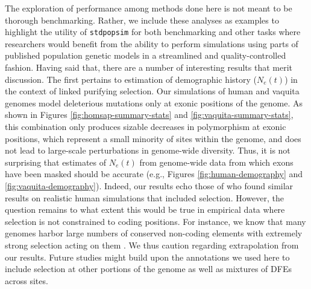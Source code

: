 \documentclass[hidelinks]{article}
\newcommand{\stdpopsim}{\texttt{stdpopsim}\xspace}
\begin{document}
    The exploration of performance among methods done here is not meant to be thorough
    benchmarking.
    Rather, we include these analyses as examples to highlight the utility of \stdpopsim {}
    for both benchmarking and other tasks where researchers would benefit from the ability to perform
    simulations using parts of published population genetic models in a streamlined and quality-controlled fashion.
    Having said that, there are a number of interesting results that merit discussion.
    The first pertains to estimation of demographic history ($N_e(t)$) in the context of
    linked purifying selection. Our simulations of human and vaquita genomes
    model deleterious mutations only at exonic positions of the genome.
    As shown in Figures \ref{fig:homsap-summary-stats} and \ref{fig:vaquita-summary-stats},
    this combination only produces sizable decreases in polymorphism at exonic positions,
    which represent a small minority of sites within the genome, and does not lead to large-scale
    perturbations in genome-wide diversity. Thus, it is not surprising that estimates of $N_e(t)$
    from genome-wide data from which exons have been masked should be accurate
    (e.g., Figures \ref{fig:human-demography} and \ref{fig:vaquita-demography}).
    Indeed, our results echo those of \citet{marsh2024biases} who found 
    similar results on realistic human simulations that included selection.
    However, the question remains to what extent this would be true in empirical data where
    selection is not constrained to coding positions. For instance, we know
    that many genomes harbor large numbers
    of conserved non-coding elements \citep[e.g.,][]{siepel2005evolutionarily} with extremely
    strong selection acting on them \citep{katzman2007human,mclean2008dispensability}.
    We thus caution regarding extrapolation from our results. Future studies might build upon
    the annotations we used here to include selection at other portions of the genome as well
    as mixtures of DFEs across sites.
\end{document}
